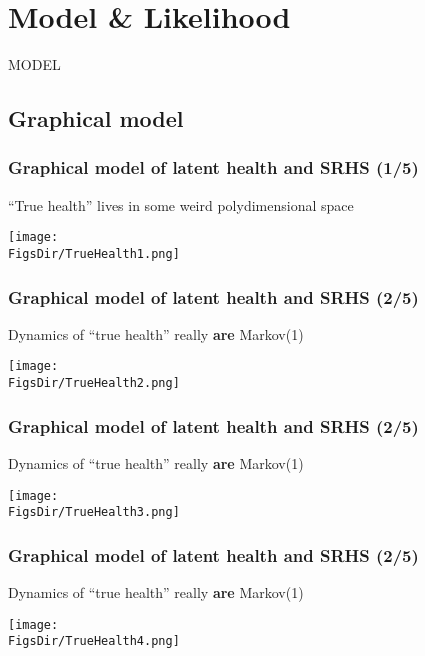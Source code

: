 \documentclass[aspectratio=169]{beamer}
\newcommand{\FigsDir}{../Figures}
\begin{document}
\section{Model \& Likelihood}


\begin{frame}
\begin{center}
\Huge
MODEL
\end{center}
\end{frame}

\subsection{Graphical model}


\begin{frame}\frametitle{Graphical model of latent health and SRHS (1/5)}
``True health'' lives in some weird polydimensional space \\ \hspace{0.5cm}
\begin{center}
	\texttt{[image: \\FigsDir/TrueHealth1.png]}
\end{center}
\end{frame}


\begin{frame}\frametitle{Graphical model of latent health and SRHS (2/5)}
Dynamics of ``true health'' really \textbf{are} Markov(1) \\ \hspace{0.5cm}
\begin{center}
	\texttt{[image: \\FigsDir/TrueHealth2.png]}
\end{center}
\end{frame}

\begin{frame}\frametitle{Graphical model of latent health and SRHS (2/5)}
Dynamics of ``true health'' really \textbf{are} Markov(1) \\ \hspace{0.5cm}
\begin{center}
	\texttt{[image: \\FigsDir/TrueHealth3.png]}
\end{center}
\end{frame}

\begin{frame}\frametitle{Graphical model of latent health and SRHS (2/5)}
Dynamics of ``true health'' really \textbf{are} Markov(1) \\ \hspace{0.5cm}
\begin{center}
	\texttt{[image: \\FigsDir/TrueHealth4.png]}
\end{center}
\end{frame}
\end{document}
